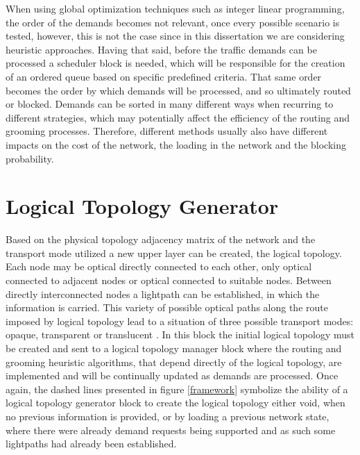   When using global optimization techniques such as integer linear programming, the order of the demands becomes not relevant, once every possible scenario is tested, however, this is not the case since in this dissertation we are considering heuristic approaches. Having that said, before the traffic demands can be processed a scheduler block is needed, which will be responsible for the creation of an ordered queue based on specific predefined criteria. That same order becomes the order by which demands will be processed, and so ultimately routed or blocked. Demands can be sorted in many different ways when recurring to different strategies, which may potentially affect the efficiency of the routing and grooming processes. Therefore, different methods usually also have different impacts on the cost of the network, the loading in the network and the blocking probability.
  
  
  
  
\section{Logical Topology Generator}
\label{logicalTopologyGenerator}

Based on the physical topology adjacency matrix of the network and the transport mode utilized a new upper layer can be created, the logical topology. Each node may be optical directly connected to each other, only optical connected to adjacent nodes or optical connected to suitable nodes. Between directly interconnected nodes a lightpath can be established, in which the information is carried. This variety of possible optical paths along the route imposed by logical topology lead to a situation of three possible transport modes: opaque, transparent or translucent \cite{Vasco}. In this block the initial logical topology must be created and sent to a logical topology manager block where the routing and grooming heuristic algorithms, that depend directly of the logical topology, are implemented and will be continually updated as demands are processed. Once again, the dashed lines presented in figure \ref{framework} symbolize the ability of a logical topology generator block to create the logical topology either void, when no previous information is provided, or by loading a previous network state, where there were already demand requests being supported and as such some lightpaths had already been established.  

